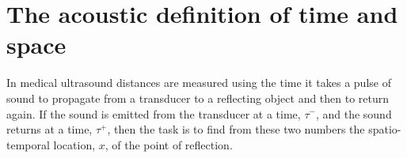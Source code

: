 \documentclass[10pt, fleqn,final,showtrims,oldfontcommands, article,a4paper,oneside]{memoir} %
\newcommand{\secref}[1]{section~\ref{sec:#1}}
\newcommand{\tm}{\tau^-}
\newcommand{\tp}{\tau^+}
\newcommand{\aetherial}{\ae therial}
\newcommand{\Poincare}{Poincar{\'e}}
\begin{document}










\section{The acoustic definition of time and space}\label{sec:measurement}


In medical ultrasound distances are measured using the time it takes a pulse of sound to propagate from a transducer
to a reflecting object and then to return again. 
If the sound is emitted from the transducer at a time, $\tm$,
and the sound returns at a time,  $\tp$,
then the task is to find from these two numbers the spatio-temporal location, $x$,
of the point of reflection.
\end{document}
